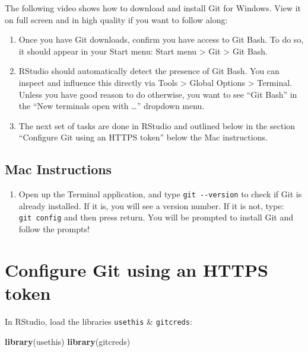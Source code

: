 \documentclass[
]{book}
\newenvironment{Shaded}{\begin{snugshade}}{\end{snugshade}}
\newcommand{\FunctionTok}[1]{\textcolor[rgb]{0.13,0.29,0.53}{\textbf{#1}}}
\newcommand{\NormalTok}[1]{#1}
\providecommand{\tightlist}{%
  \setlength{\itemsep}{0pt}\setlength{\parskip}{0pt}}
\begin{document}
The following video shows how to download and install Git for Windows. View it
on full screen and in high quality if you want to follow along:

\begin{enumerate}
\def\labelenumi{\arabic{enumi})}
\setcounter{enumi}{1}
\item
  Once you have Git downloads, confirm you have access to Git Bash. To do so,
  it should appear in your Start menu: Start menu \textgreater{} Git \textgreater{} Git Bash.
\item
  RStudio should automatically detect the presence of Git Bash. You can inspect
  and influence this directly via Tools \textgreater{} Global Options \textgreater{} Terminal. Unless you
  have good reason to do otherwise, you want to see ``Git Bash'' in the ``New
  terminals open with \ldots{}'' dropdown menu.
\item
  The next set of tasks are done in RStudio and outlined below in the section
  ``Configure Git using an HTTPS token'' below the Mac instructions.
\end{enumerate}

\subsection{Mac Instructions}\label{mac-instructions}

\begin{enumerate}
\def\labelenumi{\arabic{enumi})}
\tightlist
\item
  Open up the Terminal application, and type \texttt{git\ -\/-version} to check if Git is
  already installed. If it is, you will see a version number. If it is not, type:
  \texttt{git\ config} and then press return. You will be prompted to install Git and
  follow the prompts!
\end{enumerate}

\section{Configure Git using an HTTPS token}\label{configure-git-using-an-https-token}

In RStudio, load the libraries \texttt{usethis} \& \texttt{gitcreds}:

\begin{Shaded}
\begin{Highlighting}[]
\FunctionTok{library}\NormalTok{(usethis)}
\FunctionTok{library}\NormalTok{(gitcreds)}
\end{Highlighting}
\end{Shaded}
\end{document}
